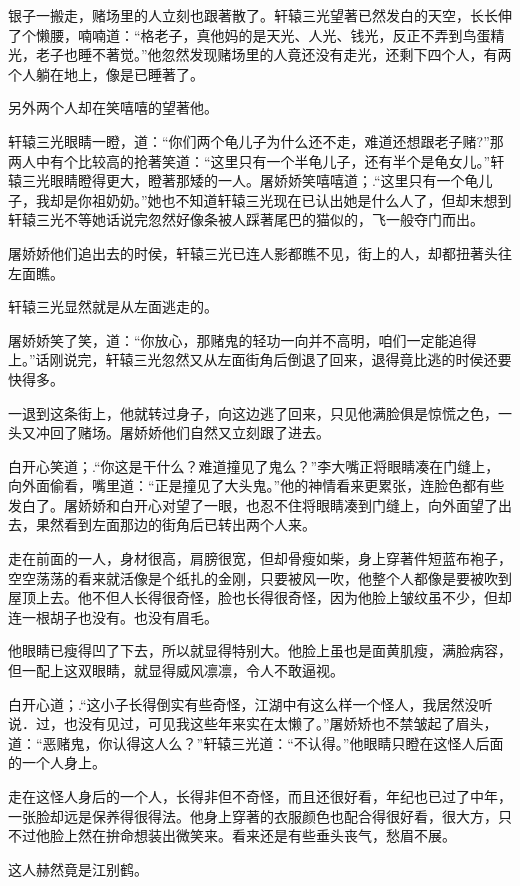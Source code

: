 \documentclass[12pt,oneside]{book}
\begin{document}
银子一搬走，赌场里的人立刻也跟著散了。轩辕三光望著已然发白的天空，长长伸了个懒腰，喃喃道：``格老子，真他妈的是天光、人光、钱光，反正不弄到鸟蛋精光，老子也睡不著觉。''他忽然发现赌场里的人竟还没有走光，还剩下四个人，有两个人躺在地上，像是已睡著了。

另外两个人却在笑嘻嘻的望著他。

轩辕三光眼睛一瞪，道：``你们两个龟儿子为什么还不走，难道还想跟老子赌?''那两人中有个比较高的抢著笑道：``这里只有一个半龟儿子，还有半个是龟女儿。''轩辕三光眼睛瞪得更大，瞪著那矮的一人。屠娇娇笑嘻嘻道；.``这里只有一个龟儿子，我却是你祖奶奶。''她也不知道轩辕三光现在已认出她是什么人了，但却末想到轩辕三光不等她话说完忽然好像条被人踩著尾巴的猫似的，飞一般夺门而出。

屠娇娇他们追出去的时侯，轩辕三光已连人影都瞧不见，街上的人，却都扭著头往左面瞧。

轩辕三光显然就是从左面逃走的。

屠娇娇笑了笑，道：``你放心，那赌鬼的轻功一向并不高明，咱们一定能追得上。''话刚说完，轩辕三光忽然又从左面街角后倒退了回来，退得竟比逃的时侯还要快得多。

一退到这条街上，他就转过身子，向这边逃了回来，只见他满脸俱是惊慌之色，一头又冲回了赌场。屠娇娇他们自然又立刻跟了进去。

白开心笑道；.``你这是干什么？难道撞见了鬼么？''李大嘴正将眼睛凑在门缝上，向外面偷看，嘴里道：``正是撞见了大头鬼。''他的神情看来更累张，连脸色都有些发白了。屠娇娇和白开心对望了一眼，也忍不住将眼睛凑到门缝上，向外面望了出去，果然看到左面那边的街角后已转出两个人来。

走在前面的一人，身材很高，肩膀很宽，但却骨瘦如柴，身上穿著件短蓝布袍子，空空荡荡的看来就活像是个纸扎的金刚，只要被风一吹，他整个人都像是要被吹到屋顶上去。他不但人长得很奇怪，脸也长得很奇怪，因为他脸上皱纹虽不少，但却连一根胡子也没有。也没有眉毛。

他眼睛已瘦得凹了下去，所以就显得特别大。他脸上虽也是面黄肌瘦，满脸病容，但一配上这双眼睛，就显得威风凛凛，令人不敢逼视。

白开心道；.``这小子长得倒实有些奇怪，江湖中有这么样一个怪人，我居然没听说．过，也没有见过，可见我这些年来实在太懒了。''屠娇矫也不禁皱起了眉头，道：``恶赌鬼，你认得这人么？''轩辕三光道：``不认得。''他眼睛只瞪在这怪人后面的一个人身上。

走在这怪人身后的一个人，长得非但不奇怪，而且还很好看，年纪也已过了中年，一张脸却远是保养得很得法。他身上穿著的衣服颜色也配合得很好看，很大方，只不过他脸上然在拚命想装出微笑来。看来还是有些垂头丧气，愁眉不展。

这人赫然竟是江别鹤。
\end{document}
